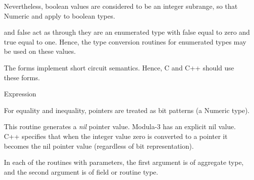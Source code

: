 Nevertheless, boolean values are considered to be an integer subrange,
so that Numeric  and  apply to
boolean types.

\begin{functionality}
 and {false} act as through they are an enumerated type
with false equal to zero and true equal to one.  Hence, the type
conversion routines for enumerated types may be used on these values.
\end{functionality}

\begin{functionality}
The  forms implement short circuit semantics.
Hence, C and C++ should use these forms.
\end{functionality}

	{Expression}
\begin{functionality}
\cxxOp
\end{functionality}

  For equality and inequality, pointers are
treated as bit patterns (\ie a Numeric type).

\begin{functionality}
This routine generates a \emph{nil} pointer value.  Modula-3 has an
explicit nil value.  C++ specifies that when the integer value zero is
converted to a pointer it becomes the nil pointer value (regardless of
bit representation).
\end{functionality}

In each of the routines with parameters, the first argument is of
aggregate type, and the second argument is of field or routine type.

